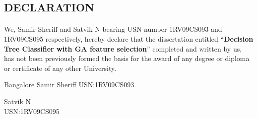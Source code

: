 \documentclass[12pt]{report}
\begin{document}
\begin{titlepage}
\begin{center}
\section*{DECLARATION}
\end{center}

\paragraph{}  We, Samir Sheriff and Satvik N bearing USN number 1RV09CS093 and 1RV09CS095 respectively, hereby declare that the dissertation entitled ``\textbf{Decision Tree Classifier with GA feature selection}'' completed and written by us, has not been previously formed the basis for the award of any degree or diploma or certificate of any other University.
\vspace{1in}

\begin{flushright} {Bangalore \hspace{4.4in} Samir Sheriff } 
 {USN:1RV09CS093}
 \end{flushright}

\begin{flushright} { Satvik N } \\
 {USN:1RV09CS095}
 \end{flushright}
\end{titlepage}
\end{document}
